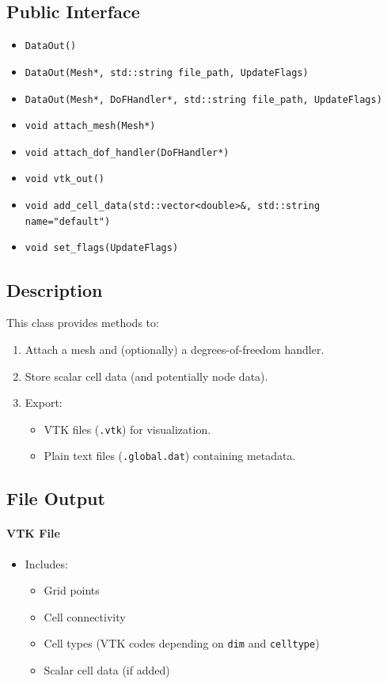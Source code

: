 \documentclass{article}
\begin{document}
\subsection*{Public Interface}

\begin{itemize}
  \item \texttt{DataOut()}
  \item \texttt{DataOut(Mesh*, std::string file\_path, UpdateFlags)}
  \item \texttt{DataOut(Mesh*, DoFHandler*, std::string file\_path, UpdateFlags)}
  \item \texttt{void attach\_mesh(Mesh*)}
  \item \texttt{void attach\_dof\_handler(DoFHandler*)}
  \item \texttt{void vtk\_out()}
  \item \texttt{void add\_cell\_data(std::vector<double>\&, std::string name="default")}
  \item \texttt{void set\_flags(UpdateFlags)}
\end{itemize}

\subsection*{Description}

This class provides methods to:
\begin{enumerate}
  \item Attach a mesh and (optionally) a degrees-of-freedom handler.
  \item Store scalar cell data (and potentially node data).
  \item Export:
    \begin{itemize}
      \item VTK files (\texttt{.vtk}) for visualization.
      \item Plain text files (\texttt{.global.dat}) containing metadata.
    \end{itemize}
\end{enumerate}

\subsection*{File Output}
\paragraph{VTK File}
\begin{itemize}
  \item Includes:
    \begin{itemize}
      \item Grid points
      \item Cell connectivity
      \item Cell types (VTK codes depending on \texttt{dim} and \texttt{celltype})
      \item Scalar cell data (if added)
    \end{itemize}
\end{itemize}
\end{document}
